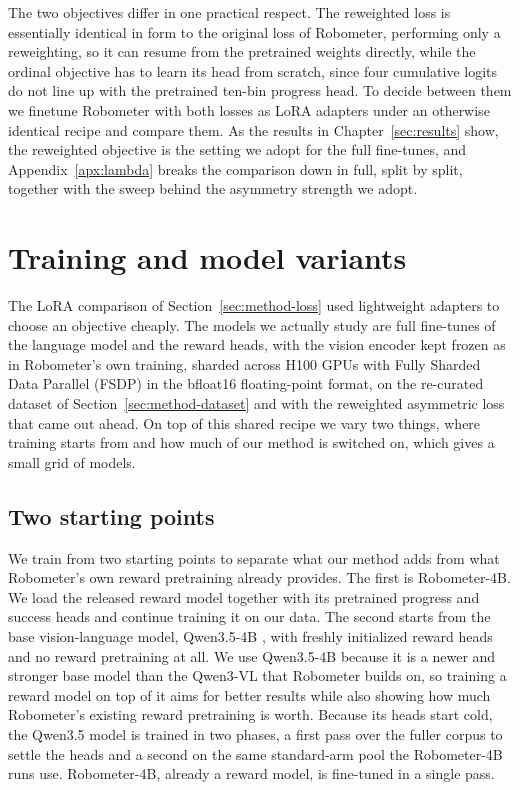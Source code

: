 The two objectives differ in one practical respect. The reweighted loss is essentially identical in form to the original loss of Robometer, performing only a reweighting, so it can resume from the pretrained weights directly, while the ordinal objective has to learn its head from scratch, since four cumulative logits do not line up with the pretrained ten-bin progress head. To decide between them we finetune Robometer with both losses as LoRA adapters \citep{hu_lora_2022} under an otherwise identical recipe and compare them. As the results in Chapter~\ref{sec:results} show, the reweighted objective is the setting we adopt for the full fine-tunes, and Appendix~\ref{apx:lambda} breaks the comparison down in full, split by split, together with the sweep behind the asymmetry strength we adopt.

\section{Training and model variants}
\label{sec:method-training}

The LoRA comparison of Section~\ref{sec:method-loss} used lightweight adapters to choose an objective cheaply. The models we actually study are full fine-tunes of the language model and the reward heads, with the vision encoder kept frozen as in Robometer's own training, sharded across H100 GPUs with Fully Sharded Data Parallel (FSDP) in the bfloat16 floating-point format, on the re-curated dataset of Section~\ref{sec:method-dataset} and with the reweighted asymmetric loss that came out ahead. On top of this shared recipe we vary two things, where training starts from and how much of our method is switched on, which gives a small grid of models.

\subsection{Two starting points}

We train from two starting points to separate what our method adds from what Robometer's own reward pretraining already provides. The first is Robometer-4B. We load the released reward model together with its pretrained progress and success heads and continue training it on our data. The second starts from the base vision-language model, Qwen3.5-4B \citep{team_qwen35-omni_2026}, with freshly initialized reward heads and no reward pretraining at all. We use Qwen3.5-4B because it is a newer and stronger base model than the Qwen3-VL that Robometer builds on, so training a reward model on top of it aims for better results while also showing how much Robometer's existing reward pretraining is worth. Because its heads start cold, the Qwen3.5 model is trained in two phases, a first pass over the fuller corpus to settle the heads and a second on the same standard-arm pool the Robometer-4B runs use. Robometer-4B, already a reward model, is fine-tuned in a single pass.

